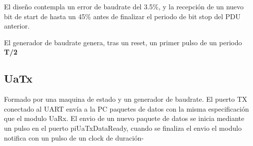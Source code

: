 \documentclass[12pt]{article}
\begin{document}
El diseño contempla un error de baudrate del 3.5\%, y la recepción de un nuevo bit de start de hasta un 45\% antes de finalizar el periodo de bit stop del PDU anterior.

El generador de baudrate genera, tras un reset, un primer pulso de un periodo \textbf{T/2}

\subsection{UaTx}
Formado por una maquina de estado y un generador de baudrate. El puerto TX conectado al UART envía a la PC paquetes de datos con la misma especificación que el modulo UaRx. El envio de un nuevo paquete de datos se inicia mediante un pulso en el puerto piUaTxDataReady, cuando se finaliza el envio el modulo notifica con un pulso de un clock de duración-
\end{document}
